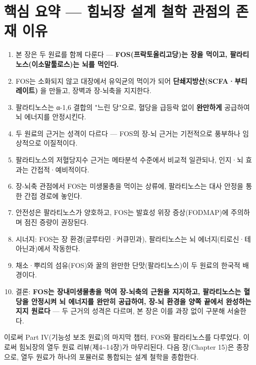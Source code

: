 \documentclass[11pt,oneside]{book}
\begin{document}
\section{핵심 요약 — 힘뇌장 설계 철학 관점의 존재 이유}
\begin{enumerate}[leftmargin=6mm,itemsep=1pt,topsep=2pt]
  \item 본 장은 두 원료를 함께 다룬다 — \textbf{FOS(프락토올리고당)는 장을 먹이고, 팔라티노스(이소말툴로스)는 뇌를 먹인다.}
  \item FOS는 소화되지 않고 대장에서 유익균의 먹이가 되어 \textbf{단쇄지방산(SCFA·부티레이트)} 을 만들고, 장벽과 장-뇌축을 지지한다.
  \item 팔라티노스는 α-1,6 결합의 "느린 당"으로, 혈당을 급등락 없이 \textbf{완만하게} 공급하여 뇌 에너지를 안정시킨다.
  \item 두 원료의 근거는 성격이 다르다 — FOS의 장-뇌 근거는 기전적으로 풍부하나 임상적으로 이질적이다.
  \item 팔라티노스의 저혈당지수 근거는 메타분석 수준에서 비교적 일관되나, 인지·뇌 효과는 간접적·예비적이다.
  \item 장-뇌축 관점에서 FOS는 미생물총을 먹이는 상류에, 팔라티노스는 대사 안정을 통한 간접 경로에 놓인다.
  \item 안전성은 팔라티노스가 양호하고, FOS는 발효성 위장 증상(FODMAP)에 주의하며 점진 증량이 권장된다.
  \item 시너지: FOS는 장 환경(글루타민·커큐민과), 팔라티노스는 뇌 에너지(티로신·테아닌과)에서 작동한다.
  \item 채소·뿌리의 섬유(FOS)와 꿀의 완만한 단맛(팔라티노스)이 두 원료의 한국적 배경이다.
  \item 결론: \textbf{FOS는 장내미생물총을 먹여 장-뇌축의 근원을 지지하고, 팔라티노스는 혈당을 안정시켜 뇌 에너지를 완만히 공급하여, 장-뇌 환경을 양쪽 끝에서 완성하는 지지 원료다} — 두 근거의 성격은 다르며, 본 장은 이를 과장 없이 구분해 서술한다.
\end{enumerate}
이로써 Part IV(기능성 보조 원료)의 마지막 챕터, FOS와 팔라티노스를 다루었다. 이로써 힘뇌장의 열두 원료 리뷰(제4\textasciitilde{}14장)가 마무리된다. 다음 장(Chapter 15)은 종장으로, 열두 원료가 하나의 포뮬러로 통합되는 설계 철학을 종합한다.
\end{document}
